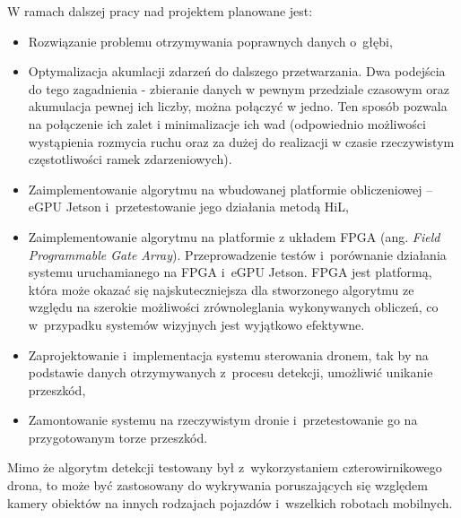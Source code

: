 W ramach dalszej pracy nad projektem planowane jest:
\begin{itemize}
    \item Rozwiązanie problemu otrzymywania poprawnych danych o~głębi,
    \item Optymalizacja akumlacji zdarzeń do dalszego przetwarzania. Dwa podejścia do tego zagadnienia - zbieranie danych w pewnym przedziale czasowym oraz akumulacja pewnej ich liczby, można połączyć w jedno. Ten sposób pozwala na połączenie ich zalet i minimalizacje ich wad (odpowiednio możliwości wystąpienia rozmycia ruchu oraz za dużej do realizacji w czasie rzeczywistym częstotliwości ramek zdarzeniowych).
    \item Zaimplementowanie algorytmu na wbudowanej platformie obliczeniowej -- eGPU Jetson i~przetestowanie jego działania metodą HiL,
    \item Zaimplementowanie algorytmu na platformie z układem FPGA (ang. \textit{Field Programmable Gate Array}). Przeprowadzenie testów i~porównanie działania systemu uruchamianego na FPGA i~eGPU Jetson. FPGA jest platformą, która może okazać się najskuteczniejsza dla stworzonego algorytmu ze względu na szerokie możliwości zrównoleglania wykonywanych obliczeń, co w~przypadku systemów wizyjnych jest wyjątkowo efektywne.
    \item Zaprojektowanie i~implementacja systemu sterowania dronem, tak by na podstawie danych otrzymywanych z~procesu detekcji, umożliwić unikanie przeszkód,
    \item Zamontowanie systemu na rzeczywistym dronie i~przetestowanie go na przygotowanym torze przeszkód.
\end{itemize}

Mimo że algorytm detekcji testowany był z~wykorzystaniem czterowirnikowego drona, to może być zastosowany do wykrywania poruszających się względem kamery obiektów na innych rodzajach pojazdów i~wszelkich robotach mobilnych.
